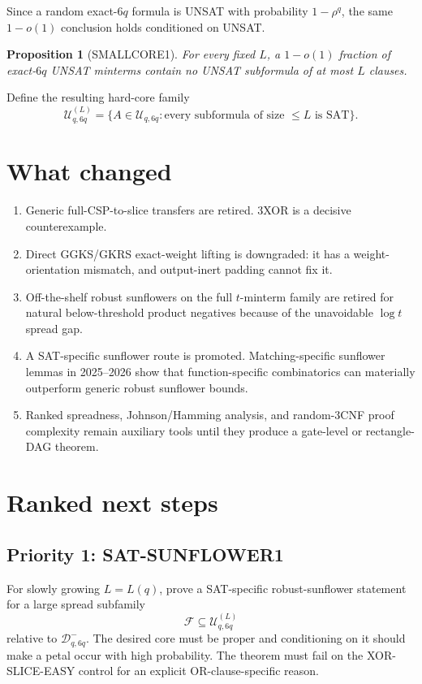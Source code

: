 \documentclass[11pt]{article}
\newtheorem{proposition}{Proposition}
\begin{document}
Since a random exact-\(6q\) formula is UNSAT with probability \(1-\rho^q\), the same \(1-o(1)\) conclusion holds conditioned on UNSAT.

\begin{proposition}[SMALLCORE1]
For every fixed \(L\), a \(1-o(1)\) fraction of exact-\(6q\) UNSAT minterms contain no UNSAT subformula of at most \(L\) clauses.
\end{proposition}

Define the resulting hard-core family
\[
\mathcal U^{(L)}_{q,6q}
=
\{A\in\mathcal U_{q,6q}:\text{every subformula of size }\le L\text{ is SAT}\}.
\]

\section{What changed}

\begin{enumerate}
\item Generic full-CSP-to-slice transfers are retired. 3XOR is a decisive counterexample.
\item Direct GGKS/GKRS exact-weight lifting is downgraded: it has a weight-orientation mismatch, and output-inert padding cannot fix it.
\item Off-the-shelf robust sunflowers on the full \(t\)-minterm family are retired for natural below-threshold product negatives because of the unavoidable \(\log t\) spread gap.
\item A SAT-specific sunflower route is promoted. Matching-specific sunflower lemmas in 2025--2026 show that function-specific combinatorics can materially outperform generic robust sunflower bounds.
\item Ranked spreadness, Johnson/Hamming analysis, and random-3CNF proof complexity remain auxiliary tools until they produce a gate-level or rectangle-DAG theorem.
\end{enumerate}

\section{Ranked next steps}

\subsection*{Priority 1: SAT-SUNFLOWER1}
For slowly growing \(L=L(q)\), prove a SAT-specific robust-sunflower statement for a large spread subfamily
\[
\mathcal F\subseteq\mathcal U^{(L)}_{q,6q}
\]
relative to \(\mathcal D^-_{q,6q}\). The desired core must be proper and conditioning on it should make a petal occur with high probability. The theorem must fail on the XOR-SLICE-EASY control for an explicit OR-clause-specific reason.
\end{document}

